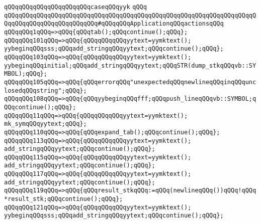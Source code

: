 \verb|qQQqqQQqqQQqqQQqqQQqqQQqcaseqQQqyyk|\newline
\verb|qQQq|\newline
\newline
\verb|qQQqqQQqqQQqqQQqqQQqqQQqqQQqqQQqqQQqqQQqqQQqqQQqqQQqqQQqqQQqqQQqqQQqqQQqqQQqqQQqqQQqqQQqqQQqqQQq#qQQqqQQqApplicationqQQqactionsqQQq|\newline
\newline
\verb|qQQqqQQq1qQQq=>qQQq{qQQqtab();qQQqcontinue();qQQq};|\newline
\verb|qQQqqQQq101qQQq=>qQQq{qQQqqQQqqQQqyytext=yymktext();|\newline
\verb|yybeginqQQqsss;qQQqadd_stringqQQqyytext;qQQqcontinue();qQQq};|\newline
\verb|qQQqqQQq103qQQq=>qQQq{qQQqqQQqqQQqyytext=yymktext();|\newline
\verb|yybeginqQQqinitial;qQQqadd_stringqQQqyytext;qQQqSTR(dump_stkqQQqvb::SYMBOL);qQQq};|\newline
\verb|qQQqqQQq105qQQq=>qQQq{qQQqerrorqQQq"unexpectedqQQqnewlineqQQqinqQQqunclosedqQQqstring";qQQq};|\newline
\verb|qQQqqQQq108qQQq=>qQQq{qQQqyybeginqQQqfff;qQQqpush_lineqQQqvb::SYMBOL;qQQqcontinue();qQQq};|\newline
\verb|qQQqqQQq11qQQq=>qQQq{qQQqqQQqqQQqyytext=yymktext();|\newline
\verb|mk_symqQQqyytext;qQQq};|\newline
\verb|qQQqqQQq110qQQq=>qQQq{qQQqexpand_tab();qQQqcontinue();qQQq};|\newline
\verb|qQQqqQQq113qQQq=>qQQq{qQQqqQQqqQQqyytext=yymktext();|\newline
\verb|add_stringqQQqyytext;qQQqcontinue();qQQq};|\newline
\verb|qQQqqQQq115qQQq=>qQQq{qQQqqQQqqQQqyytext=yymktext();|\newline
\verb|add_stringqQQqyytext;qQQqcontinue();qQQq};|\newline
\verb|qQQqqQQq117qQQq=>qQQq{qQQqqQQqqQQqyytext=yymktext();|\newline
\verb|add_stringqQQqyytext;qQQqcontinue();qQQq};|\newline
\verb|qQQqqQQq119qQQq=>qQQq{qQQqresult_stkqQQq:=qQQq(newlineqQQq())qQQq!qQQq*result_stk;qQQqcontinue();qQQq};|\newline
\verb|qQQqqQQq121qQQq=>qQQq{qQQqqQQqqQQqyytext=yymktext();|\newline
\verb|yybeginqQQqsss;qQQqadd_stringqQQqyytext;qQQqcontinue();qQQq};|\newline
